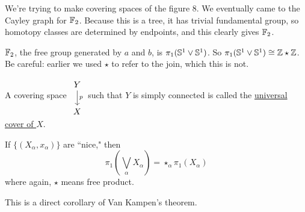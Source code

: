 \documentclass[x11names,reqno,14pt]{extarticle}
\begin{document}
We're trying to make covering spaces of the figure 8. We eventually came to the Cayley graph for $\mathbb{F}_2$. Because this is a tree, it has trivial fundamental group, so homotopy classes are determined by endpoints, and this clearly gives $\mathbb{F}_2$.

$\mathbb{F}_2$, the free group generated by $a$ and $b$, is $\pi_1(\mathbb{S}^1\vee\mathbb{S}^1)$. So $\pi_1(\mathbb{S}^1\vee\mathbb{S}^1)\cong\mathbb{Z}\star\mathbb{Z}$. Be careful: earlier we used $\star$ to refer to the join, which this is not.


A covering space $\begin{tikzcd} Y \ar[d, "p"] \\ X \end{tikzcd}$ such that $Y$ is simply connected is called the \underline{universal cover of $X$}. 


\thm 

If $\{(X_\alpha, x_\alpha)\}$ are ``nice," then 
\[
\pi_1(\bigvee_\alpha X_\alpha) = \star_\alpha\pi_1(X_\alpha)
\]
where again, $\star$ means free product. 

\proof

This is a direct corollary of Van Kampen's theorem. 
\end{document}
